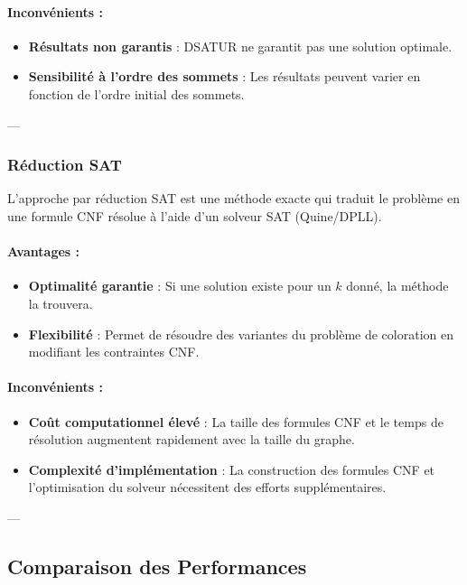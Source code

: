 \documentclass[11pt]{article}
\begin{document}
\paragraph{Inconvénients :}
\begin{itemize}
    \item \textbf{Résultats non garantis} : DSATUR ne garantit pas une solution optimale.
    \item \textbf{Sensibilité à l'ordre des sommets} : Les résultats peuvent varier en fonction de l'ordre initial des sommets.
\end{itemize}

---

\subsubsection{Réduction SAT}

L'approche par réduction SAT est une méthode exacte qui traduit le problème en une formule CNF résolue à l'aide d'un solveur SAT (Quine/DPLL).

\paragraph{Avantages :}
\begin{itemize}
    \item \textbf{Optimalité garantie} : Si une solution existe pour un \(k\) donné, la méthode la trouvera.
    \item \textbf{Flexibilité} : Permet de résoudre des variantes du problème de coloration en modifiant les contraintes CNF.
\end{itemize}

\paragraph{Inconvénients :}
\begin{itemize}
    \item \textbf{Coût computationnel élevé} : La taille des formules CNF et le temps de résolution augmentent rapidement avec la taille du graphe.
    \item \textbf{Complexité d'implémentation} : La construction des formules CNF et l'optimisation du solveur nécessitent des efforts supplémentaires.
\end{itemize}

---

\subsection{Comparaison des Performances}
\end{document}

